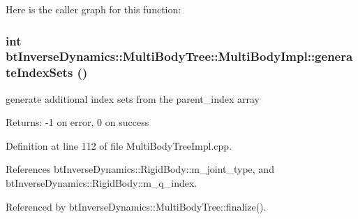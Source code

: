 Here is the caller graph for this function:\hypertarget{classbt_inverse_dynamics_1_1_multi_body_tree_1_1_multi_body_impl_8e65f0c1da65e68e3a482862f3b866c7}{
\subsubsection[generateIndexSets]{\setlength{\rightskip}{0pt plus 5cm}int btInverseDynamics::MultiBodyTree::MultiBodyImpl::generateIndexSets ()}}
\label{classbt_inverse_dynamics_1_1_multi_body_tree_1_1_multi_body_impl_8e65f0c1da65e68e3a482862f3b866c7}


generate additional index sets from the parent\_\-index array \begin{Desc}
\item[Returns:]-1 on error, 0 on success \end{Desc}


Definition at line 112 of file MultiBodyTreeImpl.cpp.

References btInverseDynamics::RigidBody::m\_\-joint\_\-type, and btInverseDynamics::RigidBody::m\_\-q\_\-index.

Referenced by btInverseDynamics::MultiBodyTree::finalize().

